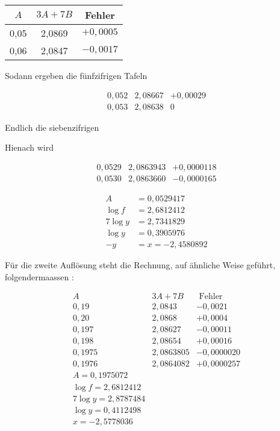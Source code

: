 \documentclass[10pt]{article}
\begin{document}
\begin{center}
\begin{tabular}{c|c|c}
\(A\) & \(3 A+7 B\) & Fehler \\
\hline
0,05 & 2,0869 & \(+0,0005\) \\
0,06 & 2,0847 & \(-0,0017\) \\
\end{tabular}
\end{center}

Sodann ergeben die fünfzifrigen Tafeln

\[
\begin{array}{l|l|c}
0,052 & 2,08667 & +0,00029 \\
0,053 & 2,08638 & 0
\end{array}
\]

Endlich die siebenzifrigen

Hienach wird

\[
\begin{array}{l|l|l}
0,0529 & 2,0863943 & +0,0000118 \\
0,0530 & 2,0863660 & -0,0000165
\end{array}
\]

\[
\begin{aligned}
A & =0,0529417 \\
\log f & =2,6812412 \\
7 \log y & =2,7341829 \\
\log y & =0,3905976 \\
-y & =x=-2,4580892
\end{aligned}
\]

Für die zweite Auflösung steht die Rechnung, auf ähnliche Weise geführt, folgendermaassen :

\[
\begin{array}{c|c|c}
A & 3 A+7 B & \text { Fehler } \\
\hline 0,19 & 2,0843 & -0,0021 \\
0,20 & 2,0868 & +0,0004 \\
0,197 & 2,08627 & -0,00011 \\
0,198 & 2,08654 & +0,00016 \\
0,1975 & 2,0863805 & -0,0000020 \\
0,1976 & 2,0864082 & +0,0000257 \\
A=0,1975072 \\
\log f=2,6812412 \\
\hline 7 \log y=2,8787484 \\
\log y=0,4112498 \\
x=-2,5778036
\end{array}
\]
\end{document}
